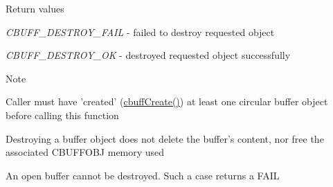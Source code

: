 \begin{DoxyRetVals}{Return values}
\item[{\em CBUFF\_\-DESTROY\_\-FAIL}]-\/ failed to destroy requested object \item[{\em CBUFF\_\-DESTROY\_\-OK}]-\/ destroyed requested object successfully\end{DoxyRetVals}
\begin{DoxyNote}{Note}

\begin{DoxyEnumerate}
\item Caller must have 'created' (\hyperlink{group___c_b_u_f_fcreate_destroy_functions_gaeeaed884818fd76417da6347fd033a44}{cbuffCreate()}) at least one circular buffer object before calling this function
\item Destroying a buffer object does not delete the buffer's content, nor free the associated CBUFFOBJ memory used
\item An open buffer cannot be destroyed. Such a case returns a FAIL 
\end{DoxyEnumerate}
\end{DoxyNote}
